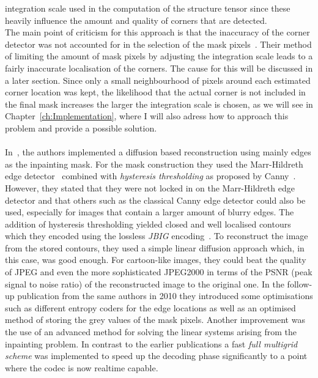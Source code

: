 integration scale used in the computation of the structure tensor since these heavily influence the
amount and quality of corners that are detected. \\
The main point of criticism for this approach is that the inaccuracy of the corner 
detector was not accounted for in the selection of the mask
pixels~\cite{conversation}. Their method of limiting the amount of mask pixels by adjusting the integration scale leads
to a fairly inaccurate localisation of the corners. The cause for this will be discussed in
a later section.
Since only a small neighbourhood of pixels around each estimated corner
location was kept, the likelihood that the actual corner is not included in the final mask
increases the larger the integration scale is chosen, as we will see in Chapter~\ref{ch:Implementation}, 
where I will also adress how to approach this problem and provide a possible solution.\\
\\
In~\cite{mainberger09, mainberger10}, the authors implemented a diffusion based reconstruction
using mainly edges as the inpainting mask. For the mask construction they used the Marr-Hildreth
edge detector~\cite{marr80} combined with \textit{hysteresis thresholding} as proposed by
Canny~\cite{canny86}.
However, they stated that they were not locked in on the Marr-Hildreth edge detector and that
others such as the classical Canny edge detector could also be used, especially for images that
contain a larger amount of blurry edges. The addition of hysteresis thresholding yielded closed and
well localised contours which they encoded using the lossless \textit{JBIG} encoding~\cite{jbig}.
To reconstruct the image from the stored contours, they used a simple linear diffusion approach
which, in this case, was good enough. For cartoon-like images, they could beat the quality of
JPEG and even the more sophisticated JPEG2000 in terms of the PSNR (peak signal to noise ratio) of the reconstructed image to the
original one. In the follow-up publication from the same authors in 2010 they introduced some 
optimisations such as different
entropy coders for the edge locations as well as an optimised method of storing the grey
values of the mask pixels. Another improvement was the use of an advanced method for solving the
linear systems arising from the inpainting problem. In contrast to the earlier publications a fast
\textit{full multigrid scheme} was implemented to speed up the decoding phase significantly to 
a point where the codec is now realtime capable.\\
